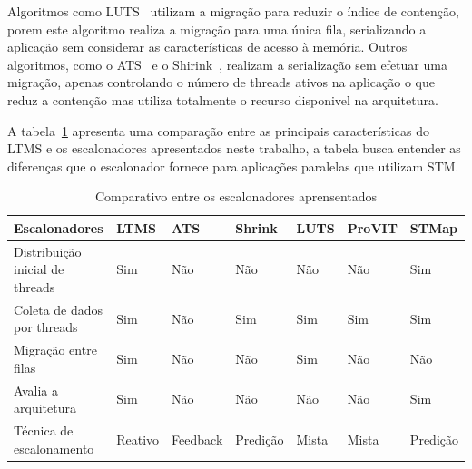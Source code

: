 \documentclass[diss,capa]{texufpel}
\begin{document}
Algoritmos como LUTS~\cite{Nicacio2012} utilizam a migração para reduzir o índice de contenção, porem este algoritmo realiza a migração para uma única fila, serializando a aplicação sem considerar as características de acesso à memória. Outros algoritmos, como o ATS~\cite{ats2008} e o Shirink~\cite{shirink2009}, realizam a serialização sem efetuar uma migração, apenas controlando o número de threads ativos na aplicação o que reduz a contenção mas utiliza totalmente o recurso disponivel na arquitetura.

A tabela~\ref{tab:compare_ltms} apresenta uma comparação entre as principais características do LTMS e os escalonadores apresentados neste trabalho, a tabela busca entender as diferenças que o escalonador fornece para aplicações paralelas que utilizam STM.

\begin{table}[]
  \footnotesize
  \centering
  \caption{Comparativo entre os escalonadores aprensentados}
  \label{tab:compare_ltms}
  \begin{tabular}{l|l|l|l|l|l|l}
  \hline
  Escalonadores & LTMS & ATS & Shrink & LUTS & ProVIT & STMap \\ \hline %
  Distribuição inicial de threads & Sim & Não & Não & Não & Não & Sim \\ 
  Coleta de dados por threads & Sim & Não & Sim & Sim & Sim & Sim \\
  Migração entre filas & Sim & Não & Não & Sim & Não & Não \\
  Avalia a arquitetura  & Sim & Não & Não & Não & Não & Sim \\
  Técnica de escalonamento & Reativo & Feedback & Predição & Mista & Mista & Predição \\ 
  \hline
  \end{tabular}
\end{table}



\end{document}
